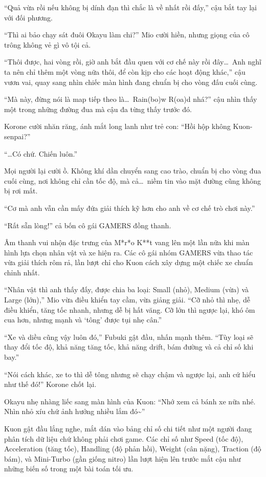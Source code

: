 \documentclass[../main.tex]{subfiles}
\begin{document}
``Quả vừa rồi nếu không bị dính đạn thì chắc là về nhất rồi đấy,'' cậu bắt tay lại với đối phương.

``Thì ai bảo chạy sát đuôi Okayu làm chi?'' Mio cười hiền, nhưng giọng của cô trông không vẻ gì vô tội cả.

``Thôi được, hai vòng rồi, giờ anh bắt đầu quen với cơ chế này rồi đây\dots\ Anh nghĩ ta nên chỉ thêm một vòng nữa thôi, để còn kịp cho các hoạt động khác,'' cậu vươn vai, quay sang nhìn chiếc màn hình đang chuẩn bị cho vòng đấu cuối cùng.

``Mà này, đừng nói là map tiếp theo là\dots\ Rain(bo)w R(oa)d nhá?'' cậu nhìn thấy một trong những đường đua mà cậu đa từng thấy trước đó.

Korone cười nhăn răng, ánh mắt long lanh như trẻ con: ``Hồi hộp không Kuon-senpai?''

``\dots Có chứ. Chiến luôn.''

Mọi người lại cười ồ. Không khí dần chuyển sang cao trào, chuẩn bị cho vòng đua cuối cùng, nơi không chỉ cần tốc độ, mà cả\dots\ niềm tin vào mặt đường cũng không bị rơi mất.

``Cơ mà anh vẫn cần mấy đứa giải thích kỹ hơn cho anh về cơ chế trò chơi này.''

``Rất sẵn lòng!'' cả bốn cô gái GAMERS đồng thanh.

\ct

Âm thanh vui nhộn đặc trưng của M*r*o K**t vang lên một lần nữa khi màn hình lựa chọn nhân vật và xe hiện ra. Các cô gái nhóm GAMERS vừa thao tác vừa giải thích rôm rả, lần lượt chỉ cho Kuon cách xây dựng một chiếc xe chuẩn chỉnh nhất.

``Nhân vật thì anh thấy đấy, được chia ba loại: Small (nhỏ), Medium (vừa) và Large (lớn),'' Mio vừa điều khiển tay cầm, vừa giảng giải. ``Cỡ nhỏ thì nhẹ, dễ điều khiển, tăng tốc nhanh, nhưng dễ bị hất văng. Cỡ lớn thì ngược lại, khó ôm cua hơn, nhưng mạnh và `tông' được tụi nhẹ cân.''

``Xe và diều cũng vậy luôn đó,'' Fubuki gật đầu, nhấn mạnh thêm. ``Tùy loại sẽ thay đổi tốc độ, khả năng tăng tốc, khả năng drift, bám đường và cả chỉ số khi bay.''

``Nói cách khác, xe to thì dễ tông nhưng sẽ chạy chậm và ngược lại, anh cứ hiểu như thế đó!'' Korone chốt lại.

Okayu nhẹ nhàng liếc sang màn hình của Kuon: ``Nhớ xem cả bánh xe nữa nhé. Nhìn nhỏ xíu chứ ảnh hưởng nhiều lắm đó\~{}''

Kuon gật đầu lắng nghe, mắt dán vào bảng chỉ số chi tiết như một người đang phân tích dữ liệu chứ không phải chơi game. Các chỉ số như Speed (tốc độ), Acceleration (tăng tốc), Handling (độ phản hồi), Weight (cân nặng), Traction (độ bám), và Mini-Turbo (gần giống nitro) lần lượt hiện lên trước mắt cậu như những biến số trong một bài toán tối ưu.
\end{document}
